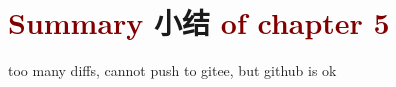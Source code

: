 \section{\textcolor{Maroon}{Summary} 小结 \textcolor{Maroon}{of chapter 5}}\label{sec:summary-chapter5}

\cite{dregerSecondharmonicGenerationNonlinear1990,zubairyAnalyticApproachSecondharmonic1985}

too many diffs, cannot push to gitee, but github is ok

\cite{katoSecondharmonicGeneration20481986,katoTemperaturetuned90Phasematching1994,brunerTemperaturedependentSellmeierEquation2003,jundtTemperaturedependentSellmeierEquation1997,katoSellmeierThermoopticDispersion2002}